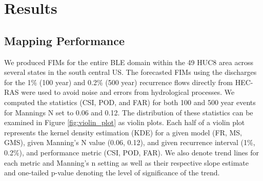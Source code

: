 \section{Results}
\label{sec:results}
%
\subsection{Mapping Performance}
\label{ssec:mapping_performance}
%
We produced FIMs for the entire BLE domain within the 49 HUC8 area across several states in the south central US. 
The forecasted FIMs using the discharges for the 1\% (100 year) and 0.2\% (500 year) recurrence flows directly from HEC-RAS were used to avoid noise and errors from hydrological processes.
We computed the statistics (CSI, POD, and FAR) for both 100 and 500 year events for Mannings N set to 0.06 and 0.12. 
The distribution of these statistics can be examined in Figure \ref{fig:violin_plot} as violin plots.
Each half of a violin plot represents the kernel density estimation (KDE) for a given model (FR, MS, GMS), given Manning's N value (0.06, 0.12), and given recurrence interval (1\%, 0.2\%), and performance metric (CSI, POD, FAR).
We also denote trend lines for each metric and Manning's n setting as well as their respective slope estimate and one-tailed p-value denoting the level of significance of the trend.

